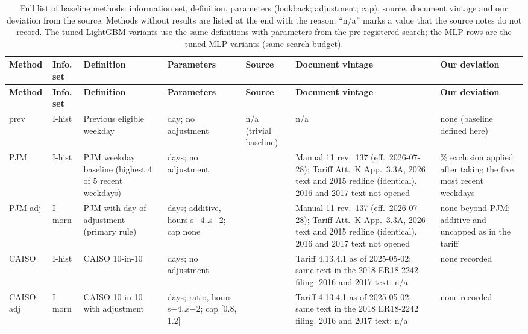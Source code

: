 \begingroup\footnotesize\setlength{\tabcolsep}{3pt}
\begin{longtable}{@{}>{\raggedright\arraybackslash}p{1.8cm}>{\raggedright\arraybackslash}p{1.6cm}>{\raggedright\arraybackslash}p{2.2cm}>{\raggedright\arraybackslash}p{2.2cm}>{\raggedright\arraybackslash}p{1.4cm}>{\raggedright\arraybackslash}p{2.6cm}>{\raggedright\arraybackslash}p{2.8cm}@{}}
\caption{Full list of baseline methods: information set, definition, parameters (lookback; adjustment; cap), source, document vintage and our deviation from the source. Methods without results are listed at the end with the reason. ``n/a'' marks a value that the source notes do not record. The tuned LightGBM variants use the same definitions with parameters from the pre-registered search; the MLP rows are the tuned MLP variants (same search budget).}\label{tabS:methodsfull}\\
\toprule
\textbf{Method} & \textbf{Info. set} & \textbf{Definition} & \textbf{Parameters} & \textbf{Source} & \textbf{Document vintage} & \textbf{Our deviation} \\
\midrule\endfirsthead
\toprule
\textbf{Method} & \textbf{Info. set} & \textbf{Definition} & \textbf{Parameters} & \textbf{Source} & \textbf{Document vintage} & \textbf{Our deviation} \\
\midrule\endhead
\bottomrule\endfoot
prev & I-hist & Previous eligible weekday & 1 day; no adjustment & n/a (trivial baseline) & n/a & none (baseline defined here) \\
PJM & I-hist & PJM weekday baseline (highest 4 of 5 recent weekdays) & 45 days; no adjustment & \cite{pjm_manual11,pjm_attk} & Manual 11 rev.\ 137 (eff.\ 2026-07-28); Tariff Att.\ K App.\ 3.3A, 2026 text and 2015 redline (identical). 2016 and 2017 text not opened & 25 \% exclusion applied after taking the five most recent weekdays \\
PJM-adj & I-morn & PJM with day-of adjustment (primary rule) & 45 days; additive, hours s$-$4..s$-$2; cap none & \cite{pjm_manual11,pjm_attk} & Manual 11 rev.\ 137 (eff.\ 2026-07-28); Tariff Att.\ K App.\ 3.3A, 2026 text and 2015 redline (identical). 2016 and 2017 text not opened & none beyond PJM; additive and uncapped as in the tariff \\
CAISO & I-hist & CAISO 10-in-10 & 45 days; no adjustment & \cite{caiso_tariff} & Tariff 4.13.4.1 as of 2025-05-02; same text in the 2018 ER18-2242 filing. 2016 and 2017 text: n/a & none recorded \\
CAISO-adj & I-morn & CAISO 10-in-10 with adjustment & 45 days; ratio, hours s$-$4..s$-$2; cap [0.8, 1.2] & \cite{caiso_tariff} & Tariff 4.13.4.1 as of 2025-05-02; same text in the 2018 ER18-2242 filing. 2016 and 2017 text: n/a & none recorded \\

\end{longtable}
